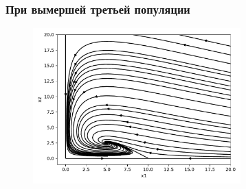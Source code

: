    \subsubsection{При вымершей третьей популяции}

    \begin{figure}[H]
        \centering
        \includegraphics[width=8cm]{pictures/kx3_0vector.pdf}
    \end{figure}

